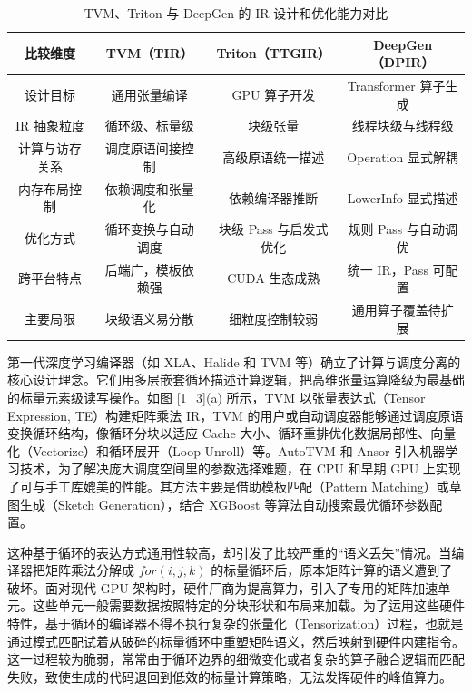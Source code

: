 \begin{table}[htbp]
\caption{TVM、Triton 与 DeepGen 的 IR 设计和优化能力对比}\label{tab:table1}
\vspace{0.5em}\centering\wuhao
\renewcommand{\arraystretch}{1.35}
\begin{tabular}{cccc}
\toprule[1.5pt]
比较维度 & TVM（TIR） & Triton（TTGIR） & DeepGen（DPIR）  \\\midrule[1pt]
设计目标 & 通用张量编译 & GPU 算子开发 & Transformer 算子生成 \\
IR 抽象粒度 & 循环级、标量级 & 块级张量 & 线程块级与线程级 \\
计算与访存关系 & 调度原语间接控制 & 高级原语统一描述 & Operation 显式解耦 \\
内存布局控制 & 依赖调度和张量化 & 依赖编译器推断 & LowerInfo 显式描述 \\
优化方式 & 循环变换与自动调度 & 块级 Pass 与启发式优化 & 规则 Pass 与自动调优 \\
跨平台特点 & 后端广，模板依赖强 & CUDA 生态成熟 & 统一 IR，Pass 可配置 \\
主要局限 & 块级语义易分散 & 细粒度控制较弱 & 通用算子覆盖待扩展 \\\bottomrule[1.5pt]
\end{tabular}
\vspace{\baselineskip}
\end{table}

第一代深度学习编译器（如 XLA、Halide\cite{ding2023hidet} 和 TVM 等）确立了计算与调度分离的核心设计理念。它们用多层嵌套循环描述计算逻辑，把高维张量运算降级为最基础的标量元素级读写操作。如图 \ref{1_3}(a) 所示，TVM 以张量表达式（Tensor Expression, TE）构建矩阵乘法 IR，TVM 的用户或自动调度器能够通过调度原语变换循环结构\cite{JSJA202503029}，像循环分块以适应 Cache 大小、循环重排优化数据局部性、向量化（Vectorize）和循环展开（Loop Unroll）等。AutoTVM\cite{chen2018learning} 和 Ansor\cite{zheng2020ansor} 引入机器学习技术，为了解决庞大调度空间里的参数选择难题，在 CPU 和早期 GPU 上实现了可与手工库媲美的性能。其方法主要是借助模板匹配（Pattern Matching）或草图生成（Sketch Generation），结合 XGBoost\cite{chen2016xgboost} 等算法自动搜索最优循环参数配置。

这种基于循环的表达方式通用性较高，却引发了比较严重的“语义丢失”情况。当编译器把矩阵乘法分解成 $for (i, j, k)$ 的标量循环后，原本矩阵计算的语义遭到了破坏。面对现代 GPU 架构时，硬件厂商为提高算力，引入了专用的矩阵加速单元。这些单元一般需要数据按照特定的分块形状和布局来加载。为了运用这些硬件特性，基于循环的编译器不得不执行复杂的张量化（Tensorization）过程，也就是通过模式匹配试着从破碎的标量循环中重塑矩阵语义，然后映射到硬件内建指令。这一过程较为脆弱，常常由于循环边界的细微变化或者复杂的算子融合逻辑而匹配失败，致使生成的代码退回到低效的标量计算策略，无法发挥硬件的峰值算力。

